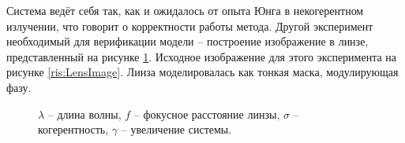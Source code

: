 Система ведёт себя так, как и ожидалось от опыта Юнга в некогерентном излучении, что говорит о корректности работы метода. Другой эксперимент необходимый для верификации модели -- построение изображение в линзе, представленный на рисунке \ref{ris:Lenses}. Исходное изображение для этого эксперимента на рисунке \ref{ris:LensImage}. Линза моделировалась как тонкая маска, модулирующая фазу.
\begin{figure}[h]
	\caption{$\lambda$ -- длина волны, $f$ -- фокусное расстояние линзы, $\sigma$ -- когерентность, $\gamma$ -- увеличение системы.}
	\label{ris:Lenses}
\end{figure}
